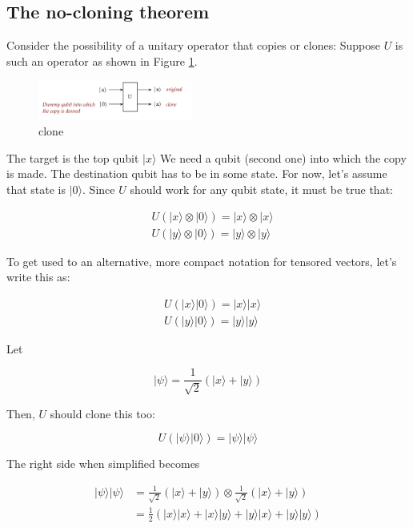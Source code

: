 \documentclass[main.tex]{subfiles}
\begin{document}
\subsection{The no-cloning theorem}

    Consider the possibility of a unitary operator that copies or clones: Suppose $U$ is such an operator as shown in Figure \ref{fig:22clone}.
    
    \begin{figure}
        \centering
        \includegraphics[width=2in]{notes/figs/n07/22clone.png}
        \caption{clone}
        \label{fig:22clone}
    \end{figure}
    
    The target is the top qubit $|x\rangle$ We need a qubit (second one) into which the copy is made. The destination qubit has to be in some state.
    For now, let's assume that state is $|0\rangle$. Since $U$ should work for any qubit state, it must be true that: 
    
    $$
    \begin{aligned}
    &U(|x\rangle \otimes|0\rangle)=|x\rangle \otimes|x\rangle \\
    &U(|y\rangle \otimes|0\rangle)=|y\rangle \otimes|y\rangle
    \end{aligned}
    $$
    
    To get used to an alternative, more compact notation for tensored vectors, let's write this as:
    
    $$
    \begin{aligned}
    &U(|x\rangle|0\rangle)=|x\rangle|x\rangle \\
    &U(|y\rangle|0\rangle)=|y\rangle|y\rangle
    \end{aligned}
    $$
    
    Let
    
    $$
    |\psi\rangle=\frac{1}{\sqrt{2}}(|x\rangle+|y\rangle)
    $$
    
    Then, $U$ should clone this too:
    
    $$
    U(|\psi\rangle|0\rangle)=|\psi\rangle|\psi\rangle
    $$
    
    The right side when simplified becomes
    
    $$
    \begin{aligned}
    |\psi\rangle|\psi\rangle &=\frac{1}{\sqrt{2}}(|x\rangle+|y\rangle) \otimes \frac{1}{\sqrt{2}}(|x\rangle+|y\rangle) \\
    &=\frac{1}{2}(|x\rangle|x\rangle+|x\rangle|y\rangle+|y\rangle|x\rangle+|y\rangle|y\rangle)
    \end{aligned}
    $$
    
\end{document}
